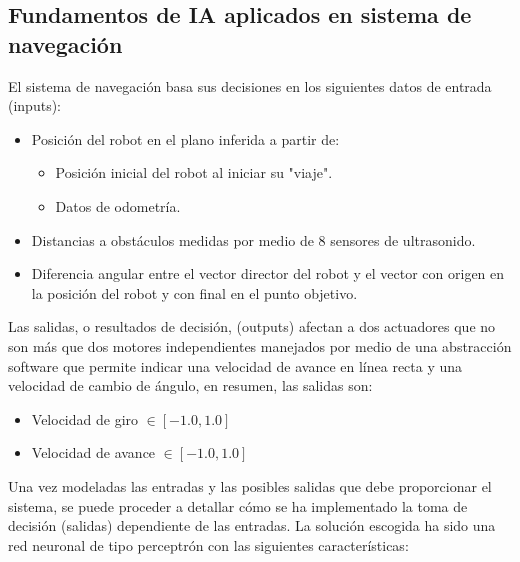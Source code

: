 \documentclass[12pt,spanish]{article}
\begin{document}
\subsection{Fundamentos de IA aplicados en sistema de navegación}
El sistema de navegación basa sus decisiones en los siguientes datos de entrada (inputs):
\begin{itemize}
	\item Posición del robot en el plano inferida a partir de:
	\begin{itemize}
		\item Posición inicial del robot al iniciar su "viaje".
		\item Datos de odometría.
	\end{itemize}
	\item Distancias a obstáculos medidas por medio de 8 sensores de ultrasonido.
	\item Diferencia angular entre el vector director del robot y el vector con origen en la posición del robot y con final en el punto objetivo.
\end{itemize}
Las salidas, o resultados de decisión, (outputs) afectan a dos actuadores que no son más que dos motores independientes manejados por medio de una abstracción software que permite indicar una velocidad de avance en línea recta y una velocidad de cambio de ángulo, en resumen, las salidas son:
\begin{itemize}
	\item Velocidad de giro $\in [-1.0,1.0] $
	\item Velocidad de avance $\in [-1.0, 1.0] $
\end{itemize}
Una vez modeladas las entradas y las posibles salidas que debe proporcionar el sistema, se puede proceder a detallar cómo se ha implementado la toma de decisión (salidas) dependiente de las entradas.
La solución escogida ha sido una red neuronal de tipo perceptrón con las siguientes características:
\end{document}
